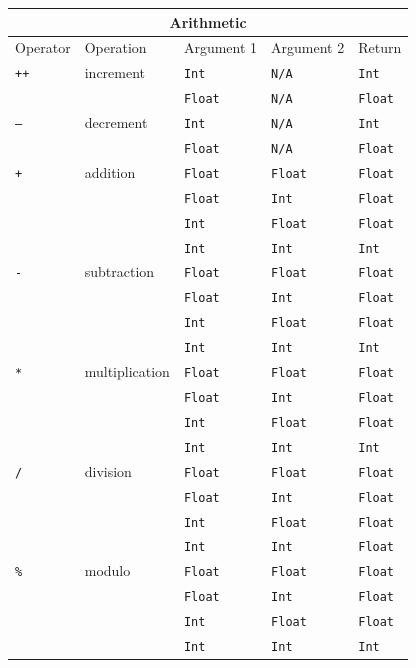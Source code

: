 \documentclass[a4paper,oneside]{book}
\newcommand{\type}[1]{\texttt{#1}}
\newcommand{\expr}[1]{\texttt{#1}}
\begin{document}
\begin{center}
\begin{tabular}{| l | l | l | l | l |}
	\hline
	\multicolumn{5}{|c|}{Arithmetic} \\ \hline
	Operator & Operation & Argument 1 & Argument 2 & Return \\ \hline
	\expr{++}& increment & \type{Int} & \type{N/A} & \type{Int}\\
	& & \type{Float} & \type{N/A} & \type{Float}\\
	\expr{--} & decrement & \type{Int} & \type{N/A} & \type{Int}\\
	& & \type{Float} & \type{N/A} & \type{Float}\\
	\expr{+} & addition & \type{Float} & \type{Float} & \type{Float} \\
	& & \type{Float} & \type{Int} & \type{Float} \\
	& & \type{Int} & \type{Float} & \type{Float} \\
	& & \type{Int} & \type{Int} & \type{Int} \\
	\expr{-} & subtraction & \type{Float} & \type{Float} & \type{Float} \\
	& & \type{Float} & \type{Int} & \type{Float} \\
	& & \type{Int} & \type{Float} & \type{Float} \\
	& & \type{Int} & \type{Int} & \type{Int} \\
	\expr{*} & multiplication & \type{Float} & \type{Float} & \type{Float} \\
	& & \type{Float} & \type{Int} & \type{Float} \\
	& & \type{Int} & \type{Float} & \type{Float} \\
	& & \type{Int} & \type{Int} & \type{Int} \\	
	\expr{/} & division & \type{Float} & \type{Float} & \type{Float} \\
	& & \type{Float} & \type{Int} & \type{Float} \\
	& & \type{Int} & \type{Float} & \type{Float} \\
	& & \type{Int} & \type{Int} & \type{Float} \\
	\expr{\%} & modulo & \type{Float} & \type{Float} & \type{Float} \\
	& & \type{Float} & \type{Int} & \type{Float} \\
	& & \type{Int} & \type{Float} & \type{Float} \\
	& & \type{Int} & \type{Int} & \type{Int} \\	 \hline

\end{tabular}
\end{center}
\end{document}
